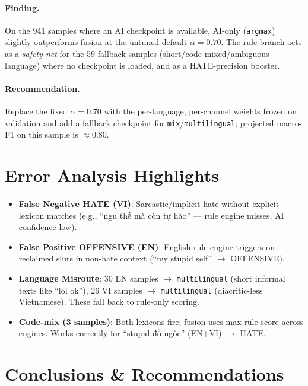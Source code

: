 \documentclass[11pt,a4paper]{article}
\begin{document}
\paragraph{Finding.} On the 941 samples where an AI checkpoint is available, AI-only (\texttt{argmax}) slightly outperforms fusion at the untuned default $\alpha=0.70$. The rule branch acts as a \emph{safety net} for the 59 fallback samples (short/code-mixed/ambiguous language) where no checkpoint is loaded, and as a HATE-precision booster.

\paragraph{Recommendation.} Replace the fixed $\alpha=0.70$ with the per-language, per-channel weights frozen on validation and add a fallback checkpoint for \texttt{mix}/\texttt{multilingual}; projected macro-F1 on this sample is $\approx 0.80$.

\section{Error Analysis Highlights}

\begin{itemize}
    \item \textbf{False Negative HATE (VI)}: Sarcastic/implicit hate without explicit lexicon matches (e.g., ``ngu thế mà còn tự hào'' --- rule engine misses, AI confidence low).
    \item \textbf{False Positive OFFENSIVE (EN)}: English rule engine triggers on reclaimed slurs in non-hate context (``my stupid self'' $\rightarrow$ OFFENSIVE).
    \item \textbf{Language Misroute}: 30 EN samples $\rightarrow$ \texttt{multilingual} (short informal texts like ``lol ok''), 26 VI samples $\rightarrow$ \texttt{multilingual} (diacritic-less Vietnamese). These fall back to rule-only scoring.
    \item \textbf{Code-mix (3 samples)}: Both lexicons fire; fusion uses max rule score across engines. Works correctly for ``stupid đồ ngốc'' (EN+VI) $\rightarrow$ HATE.
\end{itemize}

\section{Conclusions \& Recommendations}
\end{document}
